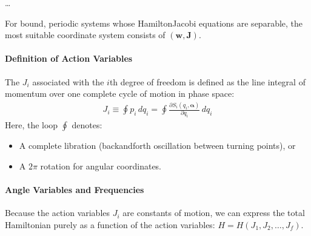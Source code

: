 \documentclass[letterpaper,10pt,english]{jupyterBook}
\begin{document}
\sphinxAtStartPar
…

\sphinxAtStartPar
For bound, periodic systems whose Hamilton\sphinxhyphen{}Jacobi equations are separable, the most suitable coordinate system consists of  \((\mathbf{w}, \mathbf{J})\).


\paragraph{Definition of Action Variables}
\label{\detokenize{ch/quantum-mechanics/atom-models/analytical-mechanics-short:definition-of-action-variables}}
\sphinxAtStartPar
The  \(J_i\) associated with the \(i\)\sphinxhyphen{}th degree of freedom is defined as the line integral of momentum over one complete cycle of motion in phase space:
\begin{equation*}
\begin{split}
J_i \equiv \oint p_i \, dq_i = \oint \frac{\partial S_i(q_i, \boldsymbol{\alpha})}{\partial q_i} \, dq_i
\end{split}
\end{equation*}
\sphinxAtStartPar
Here, the loop \(\oint\) denotes:
\begin{itemize}
\item {} 
\sphinxAtStartPar
A complete libration (back\sphinxhyphen{}and\sphinxhyphen{}forth oscillation between turning points), or

\item {} 
\sphinxAtStartPar
A \(2\pi\) rotation for angular coordinates.

\end{itemize}


\paragraph{Angle Variables and Frequencies}
\label{\detokenize{ch/quantum-mechanics/atom-models/analytical-mechanics-short:angle-variables-and-frequencies}}
\sphinxAtStartPar
Because the action variables \(J_i\) are constants of motion, we can express the total Hamiltonian purely as a function of the action variables: \(H = H(J_1, J_2, \dots, J_f)\).
\end{document}
